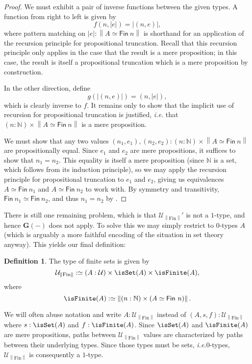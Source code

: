 \documentclass[preprint,authoryear]{sigplanconf}
\newcommand{\pref}[1]{\prettyref{#1}}
\newcommand{\ie}{\latin{i.e.}\xspace}
\newcommand{\latin}[1]{\textit{#1}}
\newcommand{\bbb}[1]{\ensuremath{\mathbb{#1}}\xspace}
\providecommand{\N}{\bbb{N}}
\let\oldequiv\equiv
\newcommand{\jeq}{\oldequiv}          %
\newcommand{\defeq}{\mathrel{:\jeq}}  %
\renewcommand{\equiv}{\simeq}         %
\theoremstyle{definition}
\newtheorem{defn}[thm]{Definition}
\theoremstyle{remark}
\newcommand{\cons}[1]{\ensuremath{\mathsf{#1}}}
\newcommand{\Type}{\ensuremath{\mathcal{U}}}
\newcommand{\FinTypeT}{\ensuremath{\Type_{\ptrunc{\text{Fin}}}}}
\newcommand{\Fin}[1]{\ensuremath{\cons{Fin}\ #1}}
\newcommand{\ptrunc}[1]{\ensuremath{\left\|#1\right\|}}
\newcommand{\ptruncI}[1]{\ensuremath{\left|#1\right|}}
\newcommand{\tygrpd}[1]{\ensuremath{\mathbf{G}(#1)}}
\begin{document}
\begin{proof}
  We must exhibit a pair of inverse functions between the given types.
  A function from right to left is given by \[ f(n, \ptruncI e) =
  \ptruncI{(n,e)}, \] where pattern matching on $\ptruncI e :
  \ptrunc{A \equiv \Fin n}$ is shorthand for an application of the
  recursion principle for propositional truncation.  Recall that this
  recursion principle only applies in the case that the result is a
  mere proposition; in this case, the result is itself a propositional
  truncation which is a mere proposition by construction.

  In the other direction, define \[ g(\ptruncI{(n, e)}) = (n,\ptruncI
  e), \] which is clearly inverse to $f$.  It remains only to show
  that the implicit use of recursion for propositional truncation is
  justified, \ie that $(n : \N) \times \ptrunc{A
    \equiv \Fin n}$ is a mere proposition.

  We must show that any two values $(n_1, e_1), (n_2, e_2) : (n : \N)
  \times \ptrunc{A \equiv \Fin n}$ are propositionally equal.  Since
  $e_1$ and $e_2$ are mere propositions, it suffices to show that $n_1
  = n_2$.  This equality is itself a mere proposition (since $\N$ is a
  set, which follows from its induction principle), so we may apply
  the recursion principle for propositional truncation to $e_1$ and
  $e_2$, giving us equivalences $A \equiv \Fin n_1$ and $A \equiv \Fin
  n_2$ to work with.  By symmetry and transitivity, $\Fin n_1 \equiv
  \Fin n_2$, and thus $n_1 = n_2$ by \pref{lem:fin-iso-equal}.
\end{proof}

There is still one remaining problem, which is that $\FinTypeT'$ is
not a $1$-type, and hence $\tygrpd{-}$ does not apply. To solve this
we may simply restrict to $0$-types $A$ (which is arguably a more
faithful encoding of the situation in set theory anyway). This yields
our final definition:

\begin{defn}
  The type of finite sets is given by \[ \FinTypeT \defeq (A : \Type)
  \times \isSet(A) \times \isFinite(A), \] where \[ \isFinite(A)
  \defeq \ptrunc{(n : \N) \times (A \equiv \Fin n)}. \]
\end{defn}
We will often abuse notation and write $A : \FinTypeT$ instead of
$(A,s,f) : \FinTypeT$ where $s : \isSet(A)$ and $f : \isFinite(A)$.
Since $\isSet(A)$ and $\isFinite(A)$ are mere propositions, paths
between $\FinTypeT$ values are characterized by paths between their
underlying types. Since those types must be sets, \ie $0$-types,
$\FinTypeT$ is consequently a $1$-type.
\end{document}

